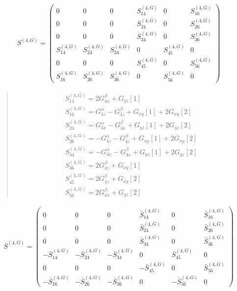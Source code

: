 \documentclass[fleqn,10pt]{jsarticle}
\begin{document}
\begin{align*}
S^{(4,G)} = \begin{pmatrix} 0 & 0 & 0 & S^{(4,G)}_{14} & 0 & S^{(4,G)}_{16} \\ 0 & 0 & 0 & S^{(4,G)}_{24} & 0 & S^{(4,G)}_{26} \\ 0 & 0 & 0 & S^{(4,G)}_{34} & 0 & S^{(4,G)}_{36} \\ S^{(4,G)}_{14} & S^{(4,G)}_{24} & S^{(4,G)}_{34} & 0 & S^{(4,G)}_{45} & 0 \\ 0 & 0 & 0 & S^{(4,G)}_{45} & 0 & S^{(4,G)}_{56} \\ S^{(4,G)}_{16} & S^{(4,G)}_{26} & S^{(4,G)}_{36} & 0 & S^{(4,G)}_{56} & 0 \end{pmatrix}
\end{align*}
\begin{quote}
\begin{align*}
& S^{(4,G)}_{14} = 2 G_{4x}^{\beta} + G_{yz}[1] \\
& S^{(4,G)}_{16} = G_{4z}^{\alpha} - G_{4z}^{\beta} + G_{xy}[1] + 2 G_{xy}[2] \\
& S^{(4,G)}_{24} = G_{4x}^{\alpha} - G_{4x}^{\beta} + G_{yz}[1] + 2 G_{yz}[2] \\
& S^{(4,G)}_{26} = - G_{4z}^{\alpha} - G_{4z}^{\beta} + G_{xy}[1] + 2 G_{xy}[2] \\
& S^{(4,G)}_{34} = - G_{4x}^{\alpha} - G_{4x}^{\beta} + G_{yz}[1] + 2 G_{yz}[2] \\
& S^{(4,G)}_{36} = 2 G_{4z}^{\beta} + G_{xy}[1] \\
& S^{(4,G)}_{45} = 2 G_{4z}^{\beta} + G_{xy}[2] \\
& S^{(4,G)}_{56} = 2 G_{4x}^{\beta} + G_{yz}[2]
\end{align*}
\end{quote}
\begin{align*}
\bar{S}^{(4,G)} = \begin{pmatrix} 0 & 0 & 0 & \bar{S}^{(4,G)}_{14} & 0 & \bar{S}^{(4,G)}_{16} \\ 0 & 0 & 0 & \bar{S}^{(4,G)}_{24} & 0 & \bar{S}^{(4,G)}_{26} \\ 0 & 0 & 0 & \bar{S}^{(4,G)}_{34} & 0 & \bar{S}^{(4,G)}_{36} \\ - \bar{S}^{(4,G)}_{14} & - \bar{S}^{(4,G)}_{24} & - \bar{S}^{(4,G)}_{34} & 0 & \bar{S}^{(4,G)}_{45} & 0 \\ 0 & 0 & 0 & - \bar{S}^{(4,G)}_{45} & 0 & \bar{S}^{(4,G)}_{56} \\ - \bar{S}^{(4,G)}_{16} & - \bar{S}^{(4,G)}_{26} & - \bar{S}^{(4,G)}_{36} & 0 & - \bar{S}^{(4,G)}_{56} & 0 \end{pmatrix}
\end{align*}
\end{document}
